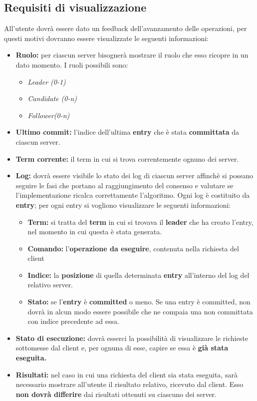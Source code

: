 	\subsection{Requisiti di visualizzazione}
	All'utente dovrà essere dato un feedback dell'avanzamento delle operazioni, per questi motivi dovranno essere visualizzate le seguenti informazioni: 
		\begin{itemize}
			\item \textbf{Ruolo:} per ciascun server bisognerà mostrare il ruolo che esso ricopre in un dato momento. I ruoli possibili sono:
				\begin{itemize}
					\item \emph{Leader (0-1)}
					\item \emph{Candidate (0-n)}
					\item \emph{Follower(0-n)}
				\end{itemize}
			\item \textbf{Ultimo commit:} l'indice dell'ultima \textbf{entry} che è stata \textbf{committata} da ciascun server.
			\item \textbf{Term corrente:} il term in cui si trova correntemente ognuno dei server.
			\item \textbf{Log:} dovrà essere visibile lo stato dei log di ciascun server affinchè si possano seguire le fasi che portano al raggiungimento del consenso e valutare se l'implementazione ricalca correttamente l'algoritmo. Ogni log è costituito da \textbf{entry}; per ogni entry si vogliono visualizzare le seguenti informazioni:
				\begin{itemize}
					\item \textbf{Term:} si tratta del \textbf{term} in cui si trovava il \textbf{leader} che ha creato l'entry, nel momento in cui questa è stata generata. 
					\item \textbf{Comando:} l'\textbf{operazione da eseguire}, contenuta nella richiesta del client 
					\item \textbf{Indice:} la \textbf{posizione} di quella determinata \textbf{entry} all'interno del log del relativo server.
					\item \textbf{Stato:} se l'\textbf{entry} è \textbf{committed} o meno. Se una entry è committed, non dovrà in alcun modo essere possibile che ne compaia una non committata con indice precedente ad essa.
				\end{itemize} 
			\item \textbf{Stato di esecuzione:} dovrà esserci la possibilità di visualizzare le richieste sottomesse dal client e, per ognuna di esse, capire se essa è \textbf{già stata eseguita.}
			\item \textbf{Risultati:} nel caso in cui una richiesta del client sia stata eseguita, sarà necessario mostrare all'utente il risultato relativo, ricevuto dal client. Esso \textbf{non dovrà differire} dai risultati ottenuti su ciascuno dei server.
		\end{itemize}

